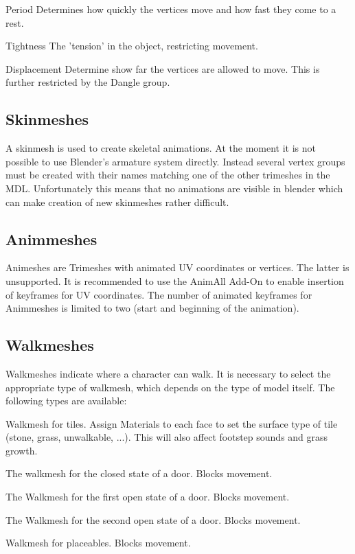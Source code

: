 \begin{property}{Period} 
Determines how quickly the vertices move and how fast they come to a rest.
\end{property}
\begin{property}{Tightness} 
The 'tension' in the object, restricting movement. 
\end{property}
\begin{property}{Displacement} 
Determine show far the vertices are allowed to move. This is further restricted by the Dangle group.
\end{property}


\subsection{Skinmeshes}
A skinmesh is used to create skeletal animations. At the moment it is not 
possible to use Blender's armature system directly. Instead several vertex groups 
must be created with their names matching one of the other trimeshes in the MDL. 
Unfortunately this means that no animations are visible in blender which can make 
creation of new skinmeshes rather difficult.


\subsection{Animmeshes}
Animeshes are Trimeshes with animated UV coordinates or vertices. The latter is unsupported. 
It is recommended to use the AnimAll Add-On to enable insertion of keyframes 
for UV coordinates. The number of animated keyframes for Animmeshes is limited to 
two (start and beginning of 
the animation).


\subsection{Walkmeshes}
Walkmeshes indicate where a character can walk. It is necessary to select 
the appropriate type of walkmesh, which depends on the type of model itself. 
The following types are available:
\begin{description}[leftmargin=10em,style=nextline]
    \item[Tileset] Walkmesh for tiles. Assign Materials to each face to set the
                   surface type of tile (stone, grass, unwalkable, ...).
                   This will also affect footstep sounds and grass growth.
    \item[Door: Closed] The walkmesh for the closed state of a door. Blocks movement.
    \item[Door: Open 1] The Walkmesh for the first open state of a door. Blocks movement.
    \item[Door: Open 2] The Walkmesh for the second open state of a door. Blocks movement.
    \item[Placeable] Walkmesh for placeables. Blocks movement.
\end{description}

